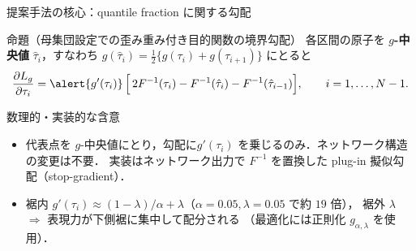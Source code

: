 \documentclass[aspectratio=169, 10pt]{beamer}
\newcommand{\blue}[1]{\textcolor{blue!80!black}{#1}}
\providecommand{\Finv}{}\renewcommand{\Finv}{F^{-1}}
\newcommand{\Lg}{L_g}
\begin{document}
\begin{frame}{提案手法の核心：quantile fraction に関する勾配}
  \begin{exampleblock}{命題（母集団設定での歪み重み付き目的関数の境界勾配）}
    各区間の原子を \textbf{$g$-中央値} $\hat\tau_i$，すなわち
    $g(\hat\tau_i)=\tfrac12\{g(\tau_i)+g(\tau_{i+1})\}$ にとると
    \[
      \frac{\partial \Lg}{\partial \tau_i}
      = \alert{g'(\tau_i)}\,\Bigl[\,2\Finv(\tau_i)-\Finv(\hat\tau_i)-\Finv(\hat\tau_{i-1})\Bigr],
      \qquad i=1,\dots,N-1 .
    \]
  \end{exampleblock}
  \begin{block}{数理的・実装的な含意}
    \begin{itemize}
      \item 代表点を $g$-中央値にとり，勾配に\alert{$g'(\tau_i)$ を乗じるのみ}．ネットワーク構造の変更は不要．
            実装はネットワーク出力で $\Finv$ を置換した \blue{plug-in 擬似勾配（stop-gradient）}．
      \item 裾内 $g'(\tau_i)\approx(1-\lambda)/\alpha+\lambda$（$\alpha=0.05,\lambda=0.05$ で約 $19$ 倍），
            裾外 $\lambda$ $\Rightarrow$ 表現力が\blue{下側裾に集中して配分}される
            （最適化には正則化 $g_{\alpha,\lambda}$ を使用）．
    \end{itemize}
  \end{block}
\end{frame}
\end{document}
